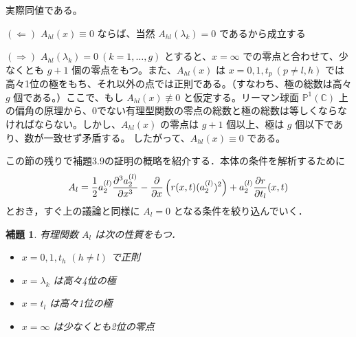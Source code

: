 \documentclass[paper=a4, fontsize=11pt]{jlreq} %
\newenvironment{story}{%
  \begin{mdframed}[
    backgroundcolor=red!5, %
    linewidth=0pt,         %
    innertopmargin=10pt,   %
    innerbottommargin=10pt,
    innerrightmargin=10pt, %
    innerleftmargin=10pt
  ]%
}{%
  \end{mdframed}%
}
\theoremstyle{break}
\newtheorem{lemma}[theorem]{補題}
\theoremstyle{qa}
\begin{document}
実際同値である。

$(\Leftarrow)$ \quad $A_{hl}(x) \equiv 0$ ならば、当然 $A_{hl}(\lambda_k) = 0$ であるから成立する

$(\Rightarrow)$ \quad $A_{hl}(\lambda_k) = 0 \ (k=1,\dots,g)$ とすると、$x=\infty$ での零点と合わせて、少なくとも $g+1$ 個の零点をもつ。また、$A_{hl}(x)$ は $x=0, 1, t_p \ (p \neq l, h)$ では高々1位の極をもち、それ以外の点では正則である。（すなわち、極の総数は高々 $g$ 個である。）ここで、もし $A_{hl}(x) \not\equiv 0$ と仮定する。リーマン球面 $\mathbb{P}^1(\mathbb{C})$ 上の偏角の原理から、0でない有理型関数の零点の総数と極の総数は等しくならなければならない。しかし、$A_{hl}(x)$ の零点は $g+1$ 個以上、極は $g$ 個以下であり、数が一致せず矛盾する。
したがって、$A_{hl}(x) \equiv 0$ である。

\begin{story}
この節の残りで補題3.9の証明の概略を紹介する．本体の条件を解析するために
\begin{equation}
    A_l = \frac{1}{2} a_2^{(l)} \frac{\partial^3 a_2^{(l)}}{\partial x^3} - \frac{\partial}{\partial x} \left( r(x,t) (a_2^{(l)})^2 \right) + a_2^{(l)} \frac{\partial r}{\partial t_l} (x,t) \notag
\end{equation}
とおき，すぐ上の議論と同様に $A_l = 0$ となる条件を絞り込んでいく．

\begin{lemma}
    有理関数 $A_l$ は次の性質をもつ．
    \begin{itemize}
        \item[(1)] $x=0, 1, t_h$ $(h \neq l)$ で正則
        \item[(2)] $x=\lambda_k$ は高々4位の極
        \item[(3)] $x=t_l$ は高々1位の極
        \item[(4)] $x=\infty$ は少なくとも2位の零点
    \end{itemize}
\end{lemma}


\end{story}
\end{document}
